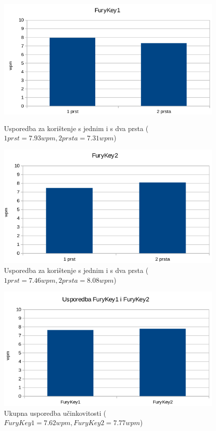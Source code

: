 \documentclass[times, utf8, zavrsni]{fer}
\begin{document}
\begin{figure}[htb]
  \centering
  \begin{minipage}[b]{0.48\textwidth}
    \includegraphics[width=\textwidth]{img/furykey1_12.png}
    \caption{Usporedba za korištenje s jednim i s dva prsta ($1 prst=7.93wpm, 2 prsta=7.31wpm$)}
    \label{chart:furykey1_12}
  \end{minipage}
  \hfill
  \begin{minipage}[b]{0.48\textwidth}
    \includegraphics[width=\textwidth]{img/furykey2_12.png}
    \caption{Usporedba za korištenje s jednim i s dva prsta ($1 prst=7.46wpm, 2 prsta=8.08wpm$)}
    \label{chart:furykey2_12}
  \end{minipage}
\end{figure}

\begin{figure}[htb]
\centering
\includegraphics[width=12cm]{img/usporedba_ukupno.png}
\caption{Ukupna usporedba učinkovitosti ($FuryKey1=7.62wpm, FuryKey2=7.77wpm$)}
\label{chart:uk}
\end{figure}
\end{document}
